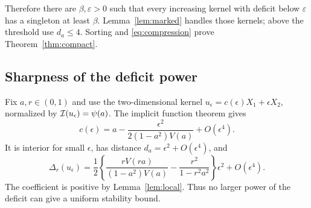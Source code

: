 Therefore there are $\beta,\varepsilon>0$ such that every increasing
kernel with deficit below $\varepsilon$ has a singleton at least $\beta$.
Lemma~\ref{lem:marked} handles those kernels; above the threshold use
$d_a\le4$. Sorting and \eqref{eq:compression} prove
Theorem~\ref{thm:compact}.

\subsection{Sharpness of the deficit power}
Fix $a,r\in(0,1)$ and use the two-dimensional kernel
$u_\epsilon=c(\epsilon)X_1+\epsilon X_2$, normalized by
$\mathcal I(u_\epsilon)=\psi(a)$. The implicit function theorem gives
\[
 c(\epsilon)=a-\frac{\epsilon^2}{2(1-a^2)V(a)}+O(\epsilon^4).
\]
It is interior for small $\epsilon$, has distance
$d_a=\epsilon^2+O(\epsilon^4)$, and
\[
 \Delta_r(u_\epsilon)=\frac12
 \left\{\frac{rV(ra)}{(1-a^2)V(a)}
             -\frac{r^2}{1-r^2a^2}\right\}\epsilon^2+O(\epsilon^4).
\]
The coefficient is positive by Lemma~\ref{lem:local}.
Thus no larger power of the deficit can give a uniform stability bound.
